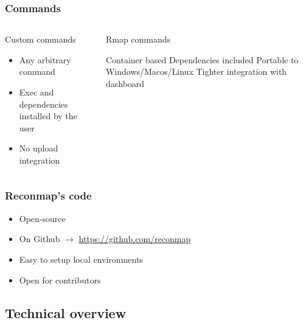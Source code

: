 \begin{frame}
    \frametitle{Commands}

    \note[item]{
    }
    \begin{columns}
		\begin{column}{0.5\textwidth}
			\begin{block}{Custom commands}
			\begin{itemize}
				\item Any arbitrary command
				\item Exec and dependencies installed by the user
				\item No upload integration
			\end{itemize}
			\end{block}
		\end{column}
		\begin{column}{0.5\textwidth}
			\begin{block}{Rmap commands}
			\begin{outline}
				\1 Container based
				\1 Dependencies included
	    			\1 Portable to Windows/Macos/Linux
	    			\1 Tighter integration with dashboard
		    \end{outline}
		    \end{block}
		\end{column}
	\end{columns}

\end{frame}

\begin{frame}
    \frametitle{Reconmap's code}

    \note[item]{
    }
    
	\begin{itemize}
		\item Open-source
		\item On Github $\rightarrow$ \url{https://github.com/reconmap}
		\item Easy to setup local environments
		\item Open for contributors
	\end{itemize}
\end{frame}

\subsection{Technical overview}

